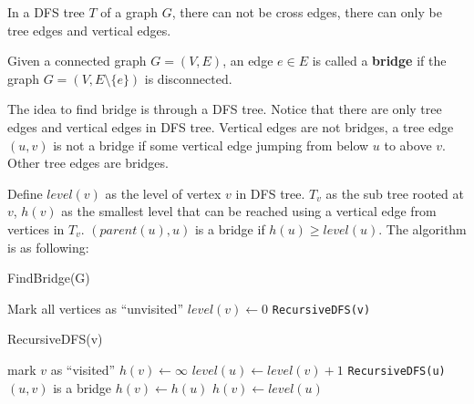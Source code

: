                 In a DFS tree $T$ of a graph $G$, there can not be cross edges, there can only be tree edges and vertical edges.

                \begin{definition}[bridge]
                    Given a connected graph $G=(V, E)$, an edge $e \in E$ is called a \textbf{bridge} if the graph $G=(V, E\setminus \{e\})$ is disconnected.
                \end{definition}

                The idea to find bridge is through a DFS tree. Notice that there are only tree edges and vertical edges in DFS tree. Vertical edges are not bridges, a tree edge $(u, v)$ is not a bridge if some vertical edge jumping from below $u$ to above $v$. Other tree edges are bridges.

                Define $level(v)$ as the level of vertex $v$ in DFS tree. $T_v$ as the sub tree rooted at $v$, $h(v)$ as the smallest level that can be reached using a vertical edge from vertices in $T_v$. $(parent(u), u)$ is a bridge if $h(u) \ge level(u)$. The algorithm is as following:
                \begin{algorithm}[H]
                    \caption{FindBridge(G)}
                    \begin{algorithmic}[1]
                        \State Mark all vertices as ``unvisited''
                                \State $level(v) \gets 0$
                                \State \texttt{RecursiveDFS(v)}
                            \EndIf
                        \EndFor
                    \end{algorithmic}
                \end{algorithm}

                \begin{algorithm}[H]
                    \caption{RecursiveDFS(v)}
                    \begin{algorithmic}[1]
                        \State mark $v$ as ``visited''
                        \State $h(v) \gets \infty$
                                \State $level(u) \gets level(v) + 1$
                                \State \texttt{RecursiveDFS(u)}
                                    \State $(u, v)$ is a bridge
                                \EndIf
                                    \State $h(v) \gets h(u)$
                                \EndIf
                            \Else
                                    \State $h(v) \gets level(u)$
                                \EndIf
                            \EndIf
                        \EndFor
                    \end{algorithmic}
                \end{algorithm}

